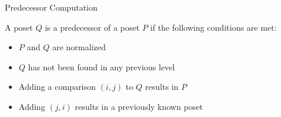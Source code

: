 \begin{frame}{Predecessor Computation}
  \begin{definition}[Predecessor]
    A poset $Q$ is a predecessor of a poset $P$ if the following conditions are met:
    \begin{itemize}
      \item<+-> $P$ and $Q$ are normalized %
      \item<+-> $Q$ has not been found in any previous level %
      \item<+-> Adding a comparison $(i, j)$ to $Q$ results in $P$ %
      \item<+-> Adding $(j, i)$ results in a previously known poset %
    \end{itemize}
  \end{definition}
\end{frame}


